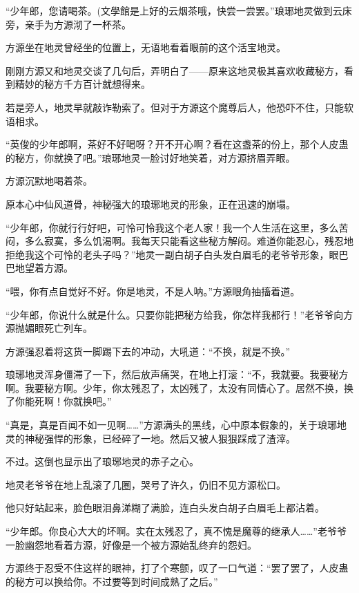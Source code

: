 
\begin{this_body}



“少年郎，您请喝茶。(文學館是上好的云烟茶哦，快尝一尝罢。”琅琊地灵做到云床旁，亲手为方源沏了一杯茶。

方源坐在地灵曾经坐的位置上，无语地看着眼前的这个活宝地灵。

刚刚方源又和地灵交谈了几句后，弄明白了——原来这地灵极其喜欢收藏秘方，看到精妙的秘方千方百计就想得来。

若是旁人，地灵早就敲诈勒索了。但对于方源这个魔尊后人，他恐吓不住，只能软语相求。

“英俊的少年郎啊，茶好不好喝呀？开不开心啊？看在这盏茶的份上，那个人皮蛊的秘方，你就换了吧。”琅琊地灵一脸讨好地笑着，对方源挤眉弄眼。

方源沉默地喝着茶。

原本心中仙风道骨，神秘强大的琅琊地灵的形象，正在迅速的崩塌。

“少年郎，你就行行好吧，可怜可怜我这个老人家！我一个人生活在这里，多么苦闷，多么寂寞，多么饥渴啊。我每天只能看这些秘方解闷。难道你能忍心，残忍地拒绝我这个可怜的老头子吗？”地灵一副白胡子白头发白眉毛的老爷爷形象，眼巴巴地望着方源。

“喂，你有点自觉好不好。你是地灵，不是人呐。”方源眼角抽搐着道。

“少年郎，你说什么就是什么。只要你能把秘方给我，你怎样我都行！”老爷爷向方源抛媚眼死亡列车。

方源强忍着将这货一脚踢下去的冲动，大吼道：“不换，就是不换。”

琅琊地灵浑身僵滞了一下，然后放声痛哭，在地上打滚：“不，我就要。我要秘方啊。我要秘方啊。少年，你太残忍了，太凶残了，太没有同情心了。居然不换，换了你能死啊！你就换吧。”

“真是，真是百闻不如一见啊……”方源满头的黑线，心中原本假象的，关于琅琊地灵的神秘强悍的形象，已经碎了一地。然后又被人狠狠踩成了渣滓。

不过。这倒也显示出了琅琊地灵的赤子之心。

地灵老爷爷在地上乱滚了几圈，哭号了许久，仍旧不见方源松口。

他只好站起来，脸色眼泪鼻涕糊了满脸，连白头发白胡子白眉毛上都沾着。

“少年郎。你良心大大的坏啊。实在太残忍了，真不愧是魔尊的继承人……”老爷爷一脸幽怨地看着方源，好像是一个被方源始乱终弃的怨妇。

方源终于忍受不住这样的眼神，打了个寒颤，叹了一口气道：“罢了罢了，人皮蛊的秘方可以换给你。不过要等到时间成熟了之后。”


\end{this_body}
